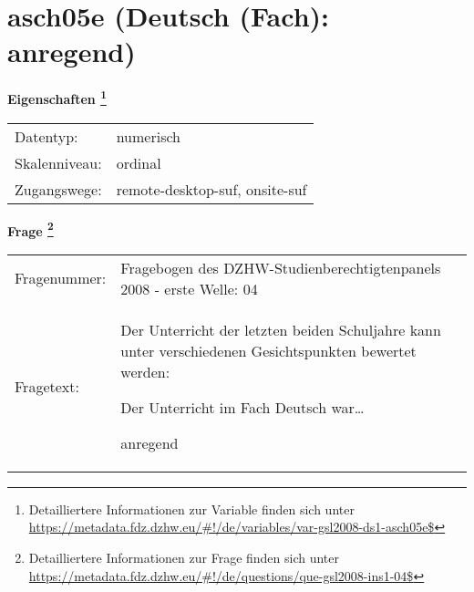 
    \setcounter{footnote}{0}

    \vspace*{-1.8cm}
	\section{asch05e (Deutsch (Fach): anregend)}
	\label{section:asch05e}



    \vspace*{0.5cm}
    \noindent\textbf{Eigenschaften
	\footnote{Detailliertere Informationen zur Variable finden sich unter
		\url{https://metadata.fdz.dzhw.eu/\#!/de/variables/var-gsl2008-ds1-asch05e$}}}\\
	\begin{tabularx}{\hsize}{@{}lX}
	Datentyp: & numerisch \\
	Skalenniveau: & ordinal \\
	Zugangswege: &
	  remote-desktop-suf, 
	  onsite-suf
 \\
    \end{tabularx}



				\vspace*{0.5cm}
                \noindent\textbf{Frage
	                \footnote{Detailliertere Informationen zur Frage finden sich unter
		              \url{https://metadata.fdz.dzhw.eu/\#!/de/questions/que-gsl2008-ins1-04$}}}\\
				\begin{tabularx}{\hsize}{@{}lX}
					Fragenummer: &
					  Fragebogen des DZHW-Studienberechtigtenpanels 2008 - erste Welle:
					  04
 \\
					Fragetext: & Der Unterricht der letzten beiden Schuljahre kann unter verschiedenen Gesichtspunkten bewertet werden:\par  Der Unterricht im Fach Deutsch war…\par  anregend \\
				\end{tabularx}





